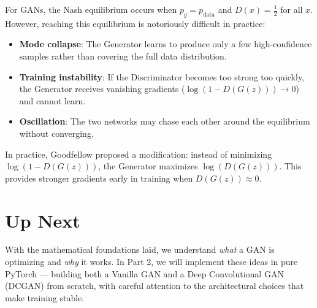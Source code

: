 \documentclass[12pt]{article}
\begin{document}
For GANs, the Nash equilibrium occurs when $p_g = p_{\text{data}}$ and $D(x) = \frac{1}{2}$ for all $x$. However, reaching this equilibrium is notoriously difficult in practice:

\begin{itemize}
    \item \textbf{Mode collapse}: The Generator learns to produce only a few high-confidence samples rather than covering the full data distribution.
    \item \textbf{Training instability}: If the Discriminator becomes too strong too quickly, the Generator receives vanishing gradients ($\log(1 - D(G(z))) \to 0$) and cannot learn.
    \item \textbf{Oscillation}: The two networks may chase each other around the equilibrium without converging.
\end{itemize}

In practice, Goodfellow proposed a modification: instead of minimizing $\log(1 - D(G(z)))$, the Generator maximizes $\log(D(G(z)))$. This provides stronger gradients early in training when $D(G(z)) \approx 0$.

\section{Up Next}
With the mathematical foundations laid, we understand \textit{what} a GAN is optimizing and \textit{why} it works. In Part 2, we will implement these ideas in pure PyTorch --- building both a Vanilla GAN and a Deep Convolutional GAN (DCGAN) from scratch, with careful attention to the architectural choices that make training stable.
\end{document}
